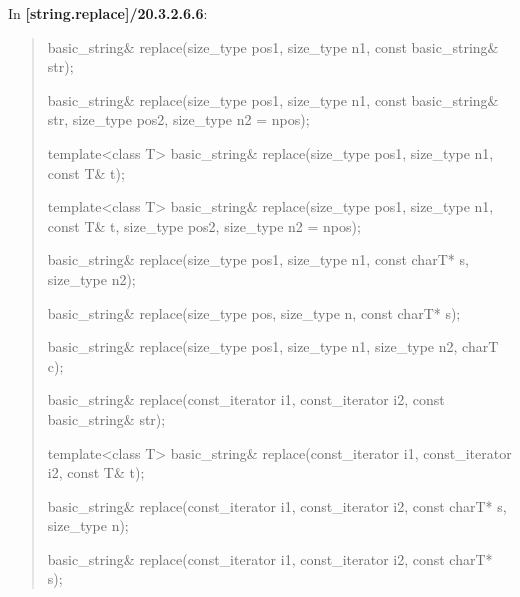 \documentclass{wg21}
\begin{document}
In \textbf{[string.replace]/20.3.2.6.6}:
\begin{quote}
\begin{itemdecl}
basic_string& replace(size_type pos1, size_type n1, const basic_string& str);
\end{itemdecl}

\begin{itemdecl}
basic_string& replace(size_type pos1, size_type n1, const basic_string& str,
                      size_type pos2, size_type n2 = npos);
\end{itemdecl}

\begin{itemdecl}
template<class T>
  basic_string& replace(size_type pos1, size_type n1, const T& t);
\end{itemdecl}

\begin{itemdecl}
template<class T>
  basic_string& replace(size_type pos1, size_type n1, const T& t,
                        size_type pos2, size_type n2 = npos);
\end{itemdecl}

\begin{itemdecl}
basic_string& replace(size_type pos1, size_type n1, const charT* s, size_type n2);
\end{itemdecl}

\begin{itemdecl}
basic_string& replace(size_type pos, size_type n, const charT* s);
\end{itemdecl}

\begin{itemdecl}
basic_string& replace(size_type pos1, size_type n1, size_type n2, charT c);
\end{itemdecl}

\begin{itemdecl}
basic_string& replace(const_iterator i1, const_iterator i2, const basic_string& str);
\end{itemdecl}

\begin{itemdecl}
template<class T>
  basic_string& replace(const_iterator i1, const_iterator i2, const T& t);
\end{itemdecl}

\begin{itemdecl}
basic_string& replace(const_iterator i1, const_iterator i2, const charT* s, size_type n);
\end{itemdecl}

\begin{itemdecl}
basic_string& replace(const_iterator i1, const_iterator i2, const charT* s);
\end{itemdecl}


\end{quote}
\end{document}
